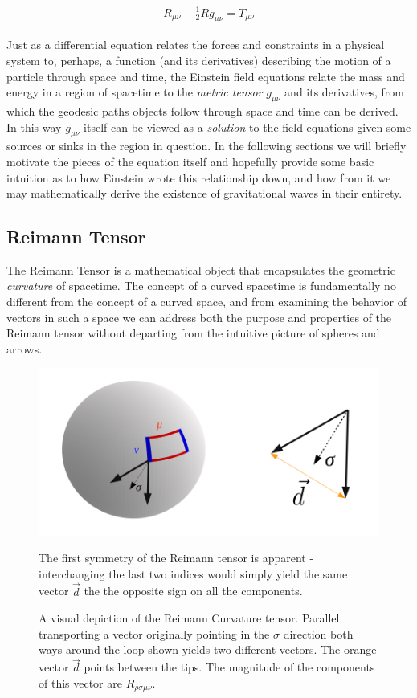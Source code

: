 \begin{align}\label{eq:fulleinst}
R_{\mu \nu} - \frac{1}{2}Rg_{\mu \nu} = T_{\mu \nu}
\end{align}

Just as a differential equation relates the forces and constraints in a physical system to, perhaps, a function (and its derivatives) describing the motion of a particle through space and time, the Einstein field equations relate the mass and energy in a region of spacetime to the \textit{metric tensor} $g_{\mu \nu}$ and its derivatives, from which the geodesic paths objects follow through space and time can be derived. In this way $g_{\mu \nu}$ itself can be viewed as a \textit{solution} to the field equations given some sources or sinks in the region in question. In the following sections we will briefly motivate the pieces of the equation itself and hopefully provide some basic intuition as to how Einstein wrote this relationship down, and how from it we may mathematically derive the existence of gravitational waves in their entirety. 

\subsection{Reimann Tensor}
The Reimann Tensor is a mathematical object that encapsulates the geometric \textit{curvature} of spacetime. The concept of a curved spacetime is fundamentally no different from the concept of a curved space, and from examining the behavior of vectors in such a space we can address both the purpose and properties of the Reimann tensor without departing from the intuitive picture of spheres and arrows.

\begin{figure}[h!]\label{fig:reimann}
\includegraphics[scale=0.5]{reimann.png}
\caption{A visual depiction of the Reimann Curvature tensor. Parallel transporting a vector originally pointing in the $\sigma$ direction both ways around the loop shown yields two different vectors. The orange vector $\vec{d}$ points between the tips. The magnitude of the components of this vector are $R_{\rho \sigma \mu \nu}$.} The first symmetry of the Reimann tensor is apparent - interchanging the last two indices would simply yield the same vector $\vec{d}$ the the opposite sign on all the components.
\label{fig:sphere}
\end{figure}

